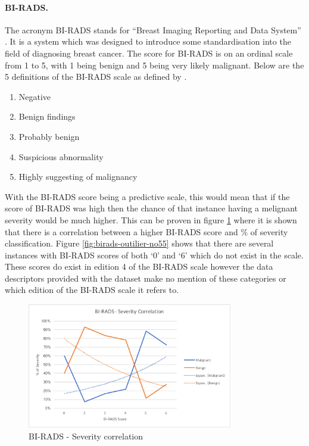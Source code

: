 \documentclass[12pt]{article}
\begin{document}
    \paragraph{BI-RADS.} \label{birad}
      The acronym BI-RADS stands for “Breast Imaging Reporting and Data System” \citep{american1998breast}. It is a system which was designed to introduce some standardisation into the field of diagnosing breast cancer. The score for BI-RADS is on an ordinal scale from 1 to 5, with 1 being benign and 5 being very likely malignant.
      Below are the 5 definitions of the BI-RADS scale as defined by \cite{american1998breast}.

      \singlespacing
      \begin{enumerate}[label=\arabic*)]
        \item Negative
        \item Benign findings
        \item Probably benign
        \item Suspicious abnormality
        \item Highly suggesting of malignancy
      \end{enumerate}
      \doublespacing

      With the BI-RADS score being a predictive scale, this would mean that if the score of BI-RADS was high then the chance of that instance having a melignant severity would be much higher. This can be proven in figure \ref{fig:birads-severity-correlation} where it is shown that there is a correlation between a higher BI-RADS score and \% of severity classification. Figure \ref{fig:birads-outilier-no55} shows that there are several instances with BI-RADS scores of both ‘0’ and ‘6’ which do not exist in the scale. These scores do exist in edition 4 of the BI-RADS scale \citep{d2003breast} however the data descriptors provided with the dataset make no mention of these categories or which edition of the BI-RADS scale it refers to.

      \begin{figure}[H]
        \centering
        \includegraphics[width=0.8\textwidth]{birads-severity-correlation}
        \caption{BI-RADS - Severity correlation}
        \label{fig:birads-severity-correlation}
      \end{figure}
\end{document}
